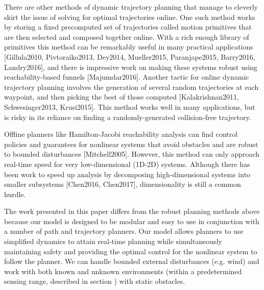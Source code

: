There are other methods of dynamic trajectory planning that manage to cleverly skirt the issue of solving for optimal trajectories online.  One such method works by storing a fixed precomputed set of trajectories called motion primitives that are then selected and composed together online. With a rich enough library of primitives this method can be remarkably useful in many practical applications [Gillula2010, Pivtoraiko2013, Dey2014, Mueller2015, Paranjape2015, Barry2016, Landry2016], and there is impressive work on making these systems robust using reachability-based funnels [Majumdar2016]. Another tactic for online dynamic trajectory planning involves the generation of several random trajectories at each waypoint, and then picking the best of those computed [Kalakrishnan2011, Schwesinger2013, Krusi2015].  This method works well in many applications, but is risky in its reliance on finding a randomly-generated collision-free trajectory.  

Offline planners like Hamilton-Jacobi reachability analysis can find control policies and guarantees for nonlinear systems that avoid obstacles and are robust to bounded disturbances [Mitchell2005].  However, this method can only approach real-time speed for very low-dimensional (1D-2D) systems. Although there has been work to speed up analysis by decomposing high-dimensional systems into smaller subsystems [Chen2016, Chen2017], dimensionality is still a common hurdle.


The work presented in this paper differs from the robust planning methods above because our model is designed to be modular and easy to use in conjunction with a number of path and trajectory planners.  Our model allows planners to use simplified dynamics to attain real-time planning while simultaneously maintaining safety and providing the optimal control for the nonlinear system to follow the planner. We can handle bounded external disturbances (e.g. wind) and work with both known and unknown environments (within a predetermined sensing range, described in section ) with static obstacles. 

